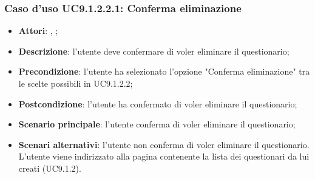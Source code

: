 				\subsubsection{Caso d'uso UC9.1.2.2.1: Conferma eliminazione}
				\label{UC9.1.2.2.1}
				\begin{itemize}
					\item \textbf{Attori}: \uau, \uaupro;
					\item \textbf{Descrizione}: l'utente deve confermare di voler eliminare il questionario; 
					\item \textbf{Precondizione}: l'utente ha selezionato l'opzione "Conferma eliminazione" tra le scelte possibili in UC9.1.2.2;
					\item \textbf{Postcondizione}: l'utente ha confermato di voler eliminare il questionario;
					\item \textbf{Scenario principale}: l'utente conferma di voler eliminare il questionario;
					\item \textbf{Scenari alternativi}: l'utente non conferma di voler eliminare il questionario. L'utente viene indirizzato alla pagina contenente la lista dei questionari da lui creati (UC9.1.2).
				\end{itemize}
								
